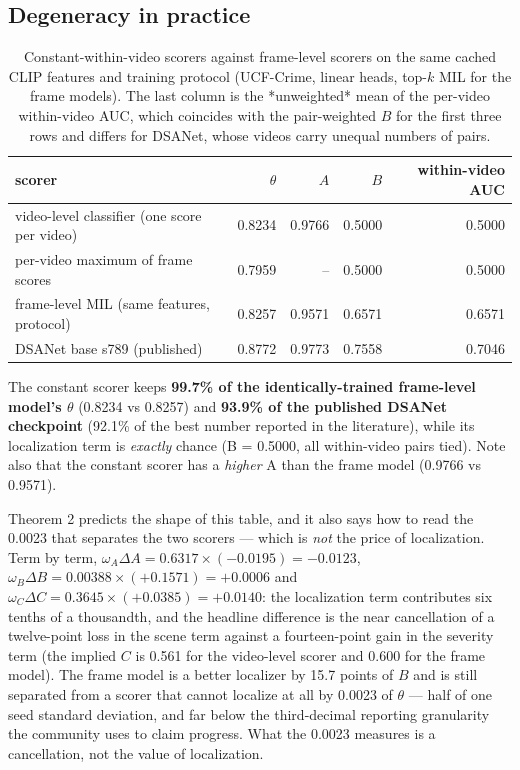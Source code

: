 \documentclass[number,preprint,12pt]{elsarticle}
\begin{document}
\subsection{Degeneracy in practice}\label{sec:degen}

\begin{table}[t]
\centering
\caption{Constant-within-video scorers against frame-level scorers on the same
cached CLIP features and training protocol (UCF-Crime, linear heads, top-$k$ MIL
for the frame models). The last column is the *unweighted* mean of the per-video
within-video AUC, which coincides with the pair-weighted $B$ for the first three
rows and differs for DSANet, whose videos carry unequal numbers of pairs.}
\label{tab:degeneracy}
\small
\begin{tabular}{@{}>{\raggedright\arraybackslash}p{6.0cm}rrrr@{}}
\toprule
scorer & $\theta$ & $A$ & $B$ & within-video AUC \\
\midrule
video-level classifier (one score per video)   & 0.8234 & 0.9766 & 0.5000 & 0.5000 \\
per-video maximum of frame scores             & 0.7959 & --     & 0.5000 & 0.5000 \\
frame-level MIL (same features, protocol)     & 0.8257 & 0.9571 & 0.6571 & 0.6571 \\
DSANet base s789 (published)                  & 0.8772 & 0.9773 & 0.7558 & 0.7046 \\
\bottomrule
\end{tabular}
\end{table}

The constant scorer keeps \textbf{99.7\% of the identically-trained frame-level model's
\(\theta\)} (0.8234 vs 0.8257) and \textbf{93.9\% of the published DSANet checkpoint}
(92.1\% of the best number reported in the literature), while its localization
term is \emph{exactly} chance (B = 0.5000, all within-video pairs tied). Note also
that the constant scorer has a \emph{higher} A than the frame model (0.9766 vs
0.9571).

Theorem 2 predicts the shape of this table, and it also says how to read the
0.0023 that separates the two scorers --- which is \emph{not} the price of
localization. Term by term,
\(\omega_A\Delta A=0.6317\times(-0.0195)=-0.0123\),
\(\omega_B\Delta B=0.00388\times(+0.1571)=+0.0006\) and
\(\omega_C\Delta C=0.3645\times(+0.0385)=+0.0140\): the localization term
contributes six tenths of a thousandth, and the headline difference is the near
cancellation of a twelve-point loss in the scene term against a fourteen-point
gain in the severity term (the implied \(C\) is 0.561 for the video-level scorer
and 0.600 for the frame model). The frame model is a better localizer by 15.7
points of \(B\) and is still separated from a scorer that cannot localize at all
by 0.0023 of \(\theta\) --- half of one seed standard deviation, and far below the
third-decimal reporting granularity the community uses to claim progress. What
the 0.0023 measures is a cancellation, not the value of localization.
\end{document}
